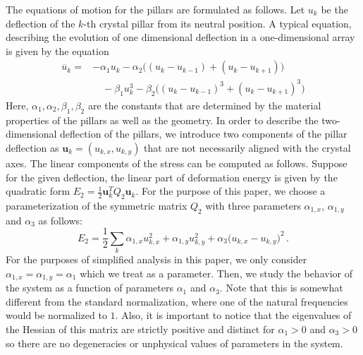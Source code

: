 \documentclass[12pt]{report}
\begin{document}
The equations of motion for the pillars are formulated as follows. 
Let $u_k$ be the deflection of the $k$-th crystal pillar from its neutral position. A typical equation, describing the evolution of one dimensional deflection in a one-dimensional  array is given by the equation 
\begin{align} 
\ddot{u_k} = & -\alpha_1 u_k - \alpha_2 \big( (u_{k}- u_{k-1}) + (u_k-u_{k+1})\big) \nonumber   \\
 & \quad- \beta_1 u_k^3  - \beta_2 \big( (u_{k}-u_{k-1})^3+(u_{k}-u_{k+1})^3 \big)  \label{1DILMs} 
\end{align}
Here, $\alpha_1, \alpha_2, \beta_1, \beta_2$ are the constants that are determined by the  material properties of the pillars as well as the geometry. In order to describe the two-dimensional deflection of the pillars, we introduce two components of the pillar deflection as $\mathbf{u}_k=(u_{k,x}, u_{k,y})$ that are not necessarily aligned with the crystal axes. The linear components of the stress can be computed as follows. Suppose for the given deflection,  the linear part of deformation energy is given by the quadratic form $E_{2}=\frac{1}{2} \mathbf{u}_k^T Q_2 \mathbf{u}_k$. For the purpose of this paper, we choose a parameterization of the symmetric matrix $Q_2$ with three parameters $\alpha_{1,x}$, $\alpha_{1,y}$ and $\alpha_3$ as follows:
\begin{equation} 
E_2=\frac{1}{2} \sum_k  \alpha_{1,x} u_{k,x}^2+ \alpha_{1,y} u_{k,y}^2 + \alpha_3 \big(u_{k,x}-u_{k,y} \big)^2 \, .  
\label{elasticE}
\end{equation} 
For the purposes of  simplified analysis in this paper, we only consider $\alpha_{1,x}=\alpha_{1,y}=\alpha_1$ which we treat as a parameter. Then, we study the behavior of the system as a function of parameters 
$\alpha_1$ and $\alpha_3$. Note that this is somewhat different from the standard normalization, where one of the natural frequencies would be normalized to $1$. Also, it is important to notice that the eigenvalues of the Hessian of this matrix are strictly positive and distinct for $\alpha_1>0$ and $\alpha_3>0$ so there are no degeneracies or unphysical values of parameters in the system. 
\end{document}
